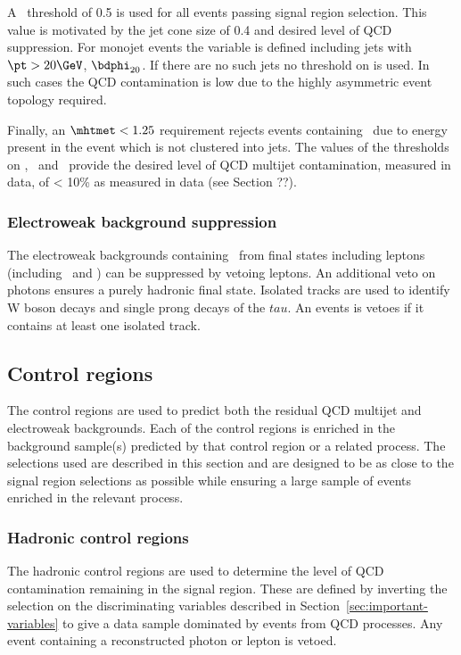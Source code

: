 A \bdphi~threshold of 0.5 is used for all events passing signal region selection.
This value is motivated by the jet cone size of 0.4 and desired level of 
QCD suppression. For monojet events the \bdphi variable is defined including jets with 
$\pt > 20 \GeV$, $\bdphi_{20}$. If there are no such jets no threshold on \bdphi is used.
In such cases the QCD contamination is low due to the highly asymmetric event topology required.

Finally, an $\mhtmet < 1.25$ requirement rejects events containing 
\mht~due to energy present in the event which is not clustered into jets. 
The values of the thresholds on \alphat, \bdphi~and \mhtmet~provide the desired 
level of QCD multijet contamination, measured in data, of < 10\% 
as measured in data (see Section ??).
\subsubsection{Electroweak background suppression}

The electroweak backgrounds containing \met~from final states including
leptons (including \wl~and \tlb) can be suppressed by vetoing leptons. 
An additional veto on photons ensures a purely hadronic final state.
Isolated tracks are used to identify W boson decays and single prong 
decays of the $tau$. An events is vetoes if it contains at least one isolated track.
\subsection{Control regions}
\label{sec:cr-sel}
The control regions are used to predict both the residual QCD multijet
and electroweak backgrounds. Each of the control regions is enriched 
in the background sample(s) predicted by that control region or a related 
process. The selections used are described in this section and are designed to 
be as close to the signal region selections as possible 
while ensuring a large sample of events enriched in the relevant process. 
\subsubsection{Hadronic control regions}
The hadronic control regions are used to determine the level of QCD contamination
remaining in the signal region. These are defined by inverting the selection on the 
discriminating variables described in Section~\ref{sec:important-variables} to give a data sample 
dominated by events from QCD processes. Any event containing a reconstructed photon or lepton is vetoed.
